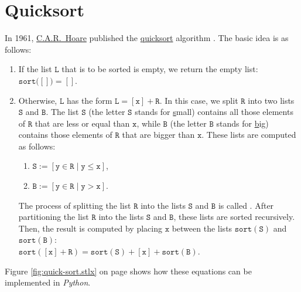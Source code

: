 \section{Quicksort}
In 1961, \href{http://en.wikipedia.org/wiki/Tony_Hoare}{C.A.R.~Hoare}  published the
\href{http://en.wikipedia.org/wiki/Quicksort}{quicksort} algorithm \cite{hoare:61}.  The basic idea is as follows:
\begin{enumerate}
\item If the list $\mathtt{L}$ that is to be sorted is empty, we return  the empty list: 
      \\[0.2cm]
      \hspace*{1.3cm} $\mathtt{sort}\bigl([]\bigr) = []$.
\item Otherwise, $\mathtt{L}$ has the form $\mathtt{L} = [\mathtt{x}] + \mathtt{R}$.  In this case, we split $\mathtt{R}$ into two lists $\mathtt{S}$ and $\mathtt{B}$.
      The list $\mathtt{S}$ (the letter $\mathtt{S}$ stands for \underline{s}mall) contains all those elements of $\mathtt{R}$ that are less
      or equal than $\mathtt{x}$,     while $\mathtt{B}$ (the letter $\mathtt{B}$ stands for \underline{b}ig) contains
      those elements of $\mathtt{R}$ that are bigger than $\mathtt{x}$.  These lists are computed as follows:
      \begin{enumerate}
      \item $\mathtt{S} := [\mathtt{y} \in \mathtt{R} \mid \mathtt{y} \leq \mathtt{x}]$,
      \item $\mathtt{B} := [\mathtt{y} \in \mathtt{R} \mid \mathtt{y} > \mathtt{x}]$.
      \end{enumerate}
      The process of splitting the list $\mathtt{R}$ into the lists $\mathtt{S}$ and $\mathtt{B}$
      is called .  After partitioning the list $\mathtt{R}$ into the
      lists $\mathtt{S}$ and $\mathtt{B}$, these lists are sorted 
      recursively.  Then, the result is computed by placing $\mathtt{x}$ between the lists $\mathtt{sort}(\mathtt{S})$ and $\mathtt{sort}(\mathtt{B})$:
      \\[0.2cm]
      \hspace*{1.3cm}
      $\mathtt{sort}([\mathtt{x}]+\mathtt{R}) = \mathtt{sort}(\mathtt{S}) + [\mathtt{x}] + \mathtt{sort}(\mathtt{B})$.
\end{enumerate}
Figure \ref{fig:quick-sort.stlx} on page \pageref{fig:quick-sort.stlx} shows how these equations can
be implemented in \textsl{Python}.

